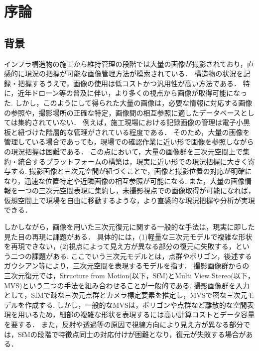 \section{序論}\label{sec:intro}
\subsection{背景}\label{subsec:background}

インフラ構造物の施工から維持管理の段階では大量の画像が撮影されており，直感的に現況の把握が可能な画像管理方法が模索されている．
構造物の状況を記録・把握するうえで，画像の使用は低コストかつ汎用性が高い方法である．
特に，近年ドローン等の普及に伴い，より多くの視点から画像が取得可能になった. 
しかし，このようにして得られた大量の画像は，必要な情報に対応する画像の参照や，撮影場所の正確な特定，画像間の相互参照に適したデータベースとしては集約されていない．
例えば，施工現場における記録画像の管理は電子小黒板と紐づけた階層的な管理がされている程度\cite{kouji-shashin}である．
そのため，大量の画像を管理している場合であっても，現場での確認作業に近い形で画像を参照しながらの現況把握は困難である．
この点において，大量の画像群を三次元空間上で集約・統合するプラットフォームの構築は，現実に近い形での現況把握に大きく寄与する.
撮影画像と三次元空間が紐づくことで，画像と撮影位置の対応が明確になり，迅速な位置特定や近隣画像の相互参照が可能になる.
また，大量の画像情報を一つの三次元空間表現に集約し，未撮影視点での画像取得が可能になれば，仮想空間上で現場を自由に移動するような，より直感的な現況把握や分析が実現できる．\par

しかしながら，画像を用いた三次元復元に関する一般的な手法は，現実に即した見た目の再現に課題がある．
具体的には，(1)軽量な三次元モデルで複雑な形状を再現できない，(2)視点によって見え方が異なる部分の復元に失敗する，という二つの課題がある.
ここでいう三次元モデルとは，点群やポリゴン，後述するガウシアン等により，三次元空間を表現するモデルを指す．
撮影画像群からの三次元復元では，Structure from Motion(以下，SfM)とMulti View Stereo(以下，MVS)という二つの手法を組み合わせることが一般的である.
撮影画像群を入力として，SfMで疎な三次元点群とカメラ標定要素を推定し，MVSで密な三次元モデルを作成する.
しかし，一般的なMVSは，ポリゴンや点群など離散的な空間表現を用いるため，細部の複雑な形状を表現するには高い計算コストとデータ容量を要する．
また，反射や透過等の原因で視線方向により見え方が異なる部分では，SfMの段階で特徴点同士の対応付けが困難となり，復元が失敗する場合がある．\par

